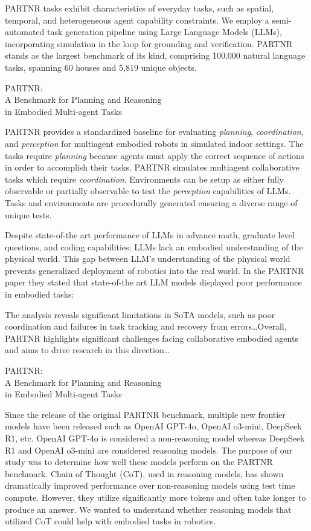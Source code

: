 \epigraph{PARTNR tasks exhibit characteristics of everyday tasks, such as spatial, temporal, and heterogeneous agent capability constraints. We employ a semi-automated task generation pipeline using Large Language Models (LLMs), incorporating simulation in the loop for grounding and verification. PARTNR stands as the largest benchmark of its kind, comprising 100,000 natural language tasks, spanning 60 houses and 5,819 unique objects.}{PARTNR: \\A Benchmark for Planning and Reasoning \\in Embodied Multi-agent Tasks}

PARTNR provides a standardized baseline for evaluating \textit{planning}, \textit{coordination}, and \textit{perception} for multiagent embodied robots in simulated indoor settings.  The tasks require \textit{planning} because agents must apply the correct sequence of actions in order to accomplish their tasks.  PARTNR simulates multiagent collaborative tasks which require \textit{coordination}.  Environments can be setup as either fully observable or partially observable to test the \textit{perception} capabilities of LLMs.  Tasks and environments are procedurally generated ensuring a diverse range of unique tests.

Despite state-of-the art performance of LLMs in advance math\cite{liu2024mathbenchevaluatingtheoryapplication}, graduate level questions\cite{rein2023gpqagraduatelevelgoogleproofqa}, and coding capabilities\cite{deepseekai2025deepseekr1incentivizingreasoningcapability,deepseekai2025deepseekv3technicalreport,openai2024openaio1card,openai2024gpt4ocard}; LLMs lack an embodied understanding of the physical world.  This gap between LLM's understanding of the physical world prevents generalized deployment of robotics into the real world.  In the PARTNR\cite{chang2024partnrbenchmarkplanningreasoning} paper they stated that state-of-the art LLM models displayed poor performance in embodied tasks:

\epigraph{
    The analysis reveals significant limitations in SoTA models, such as poor coordination and failures in task tracking and recovery from errors\dots  Overall, PARTNR highlights significant challenges facing collaborative embodied
    agents and aims to drive research in this direction\dots}{PARTNR: \\A Benchmark for Planning and Reasoning \\in Embodied Multi-agent Tasks}

Since the release of the original PARTNR benchmark, multiple new frontier models have been released such as OpenAI GPT-4o, OpenAI o3-mini, DeepSeek R1, etc.  OpenAI GPT-4o is considered a non-reasoning model whereas DeepSeek R1 and OpenAI o3-mini are considered reasoning models.  The purpose of our study was to determine how well these models perform on the PARTNR benchmark.  Chain of Thought (CoT), used in reasoning models, has shown dramatically improved performance over non-reasoning models using test time compute.  However, they utilize significantly more tokens and often take longer to produce an answer.  We wanted to understand whether reasoning models that utilized CoT could help with embodied tasks in robotics.



